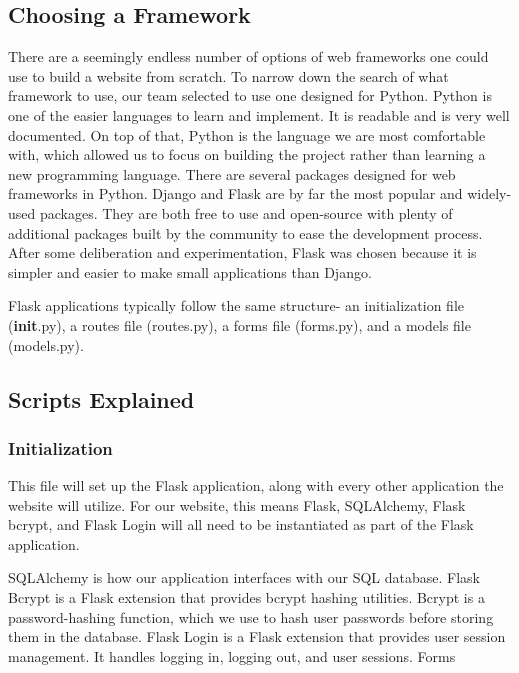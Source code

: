 \documentclass[]{book}
\begin{document}
\subsection{Choosing a Framework}\label{choosing-a-framework}

There are a seemingly endless number of options of web frameworks one
could use to build a website from scratch. To narrow down the search of
what framework to use, our team selected to use one designed for Python.
Python is one of the easier languages to learn and implement. It is
readable and is very well documented. On top of that, Python is the
language we are most comfortable with, which allowed us to focus on
building the project rather than learning a new programming language.
There are several packages designed for web frameworks in Python. Django
and Flask are by far the most popular and widely-used packages. They are
both free to use and open-source with plenty of additional packages
built by the community to ease the development process. After some
deliberation and experimentation, Flask was chosen because it is simpler
and easier to make small applications than Django.

Flask applications typically follow the same structure- an
initialization file (\textbf{init}.py), a routes file (routes.py), a
forms file (forms.py), and a models file (models.py).

\subsection{Scripts Explained}\label{scripts-explained}

\subsubsection{Initialization}\label{initialization}

This file will set up the Flask application, along with every other
application the website will utilize. For our website, this means Flask,
SQLAlchemy, Flask bcrypt, and Flask Login will all need to be
instantiated as part of the Flask application.

SQLAlchemy is how our application interfaces with our SQL database.
Flask Bcrypt is a Flask extension that provides bcrypt hashing
utilities. Bcrypt is a password-hashing function, which we use to hash
user passwords before storing them in the database. Flask Login is a
Flask extension that provides user session management. It handles
logging in, logging out, and user sessions. Forms
\end{document}
